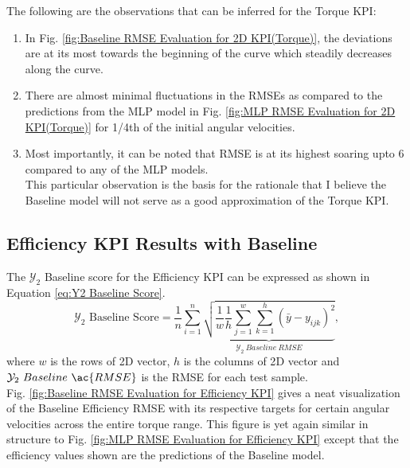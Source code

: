 \documentclass{report} %
\begin{document}
The following are the observations that can be inferred for the Torque \ac{KPI}:
\begin{enumerate}[nosep]
    
    \item In Fig. \ref{fig:Baseline RMSE Evaluation for 2D KPI(Torque)}, the deviations are at its most towards the beginning of the curve which steadily decreases along the curve.
    \item There are almost minimal fluctuations in the \ac{RMSE}s as compared to the predictions from the \ac{MLP} model in 
    Fig. \ref{fig:MLP RMSE Evaluation for 2D KPI(Torque)} for 1/4th of the initial angular velocities.
    \item Most importantly, it can be noted that \ac{RMSE} is at its highest soaring upto 6 compared to any of the \ac{MLP} models.\\
    This particular observation is the basis for the rationale that I believe the Baseline model will not serve as a good approximation of the Torque \ac{KPI}.\\
\end{enumerate}

\subsection{Efficiency KPI Results with Baseline}\label{subsec:Efficiency KPI Results with Baseline}

The $\mathcal{Y}_2$ Baseline score for the Efficiency \ac{KPI} can be expressed as shown in Equation \ref{eq:Y2 Baseline Score}.
\begin{equation}
    \text{$\mathcal{Y}_2$ Baseline Score} = \frac{1}{n} \sum_{i=1}^{n} \underbrace{ \sqrt{\frac{1}{w} \frac{1}{h} \sum_{j=1}^{w} \sum_{k=1}^{h} (\bar{y} - y_{ijk})^2}}_{\mathcal{Y}_2\ Baseline\ RMSE},
    \label{eq:Y2 Baseline Score}
\end{equation}
where \(w\) is the rows of 2\ac{D} vector, \(h\) is the columns of 2\ac{D} vector and \(\mathcal{Y}_2\ Baseline\ \ac{RMSE}\) is the \ac{RMSE} for each test sample.\\

Fig. \ref{fig:Baseline RMSE Evaluation for Efficiency KPI} gives a neat visualization of the Baseline Efficiency \ac{RMSE} with its respective targets for certain angular velocities  
across the entire torque range. This figure is yet again similar in structure to Fig. \ref{fig:MLP RMSE Evaluation for Efficiency KPI} except that the efficiency values 
shown are the predictions of the Baseline model. \\
\end{document}
